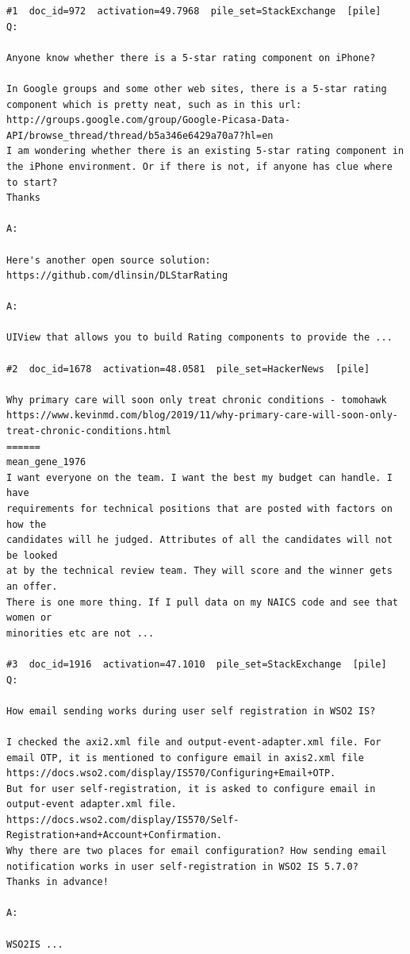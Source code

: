 \begin{verbatim}
#1  doc_id=972  activation=49.7968  pile_set=StackExchange  [pile]
Q:

Anyone know whether there is a 5-star rating component on iPhone?

In Google groups and some other web sites, there is a 5-star rating component which is pretty neat, such as in this url:
http://groups.google.com/group/Google-Picasa-Data-API/browse_thread/thread/b5a346e6429a70a7?hl=en
I am wondering whether there is an existing 5-star rating component in the iPhone environment. Or if there is not, if anyone has clue where to start?
Thanks

A:

Here's another open source solution: https://github.com/dlinsin/DLStarRating 

A:

UIView that allows you to build Rating components to provide the ...

#2  doc_id=1678  activation=48.0581  pile_set=HackerNews  [pile]

Why primary care will soon only treat chronic conditions - tomohawk
https://www.kevinmd.com/blog/2019/11/why-primary-care-will-soon-only-treat-chronic-conditions.html
======
mean_gene_1976
I want everyone on the team. I want the best my budget can handle. I have
requirements for technical positions that are posted with factors on how the
candidates will he judged. Attributes of all the candidates will not be looked
at by the technical review team. They will score and the winner gets an offer.
There is one more thing. If I pull data on my NAICS code and see that women or
minorities etc are not ...

#3  doc_id=1916  activation=47.1010  pile_set=StackExchange  [pile]
Q:

How email sending works during user self registration in WSO2 IS?

I checked the axi2.xml file and output-event-adapter.xml file. For email OTP, it is mentioned to configure email in axis2.xml file https://docs.wso2.com/display/IS570/Configuring+Email+OTP.
But for user self-registration, it is asked to configure email in output-event adapter.xml file.
https://docs.wso2.com/display/IS570/Self-Registration+and+Account+Confirmation.
Why there are two places for email configuration? How sending email notification works in user self-registration in WSO2 IS 5.7.0?
Thanks in advance!

A:

WSO2IS ...


\end{verbatim}
